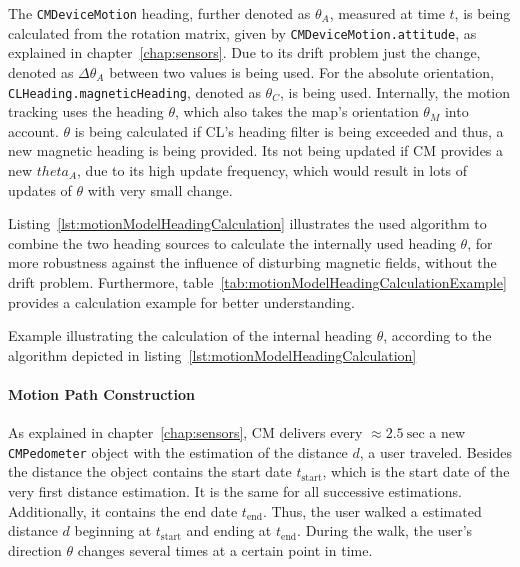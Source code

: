 The \texttt{CMDeviceMotion} heading, further denoted as $\theta_A$, measured at time $t$, is being calculated from the rotation matrix, given by \texttt{CMDeviceMotion.attitude}, as explained in chapter~\ref{chap:sensors}. Due to its drift problem just the change, denoted as $\Delta\theta_A$ between two values is being used. For the absolute orientation, \texttt{CLHeading.magneticHeading}, denoted as $\theta_C$, is being used. Internally, the motion tracking uses the heading $\theta$, which also takes the map's orientation $\theta_M$ into account. $\theta$ is being calculated if \acs{CL}'s heading filter is being exceeded and thus, a new magnetic heading is being provided. Its not being updated if \acs{CM} provides a new $theta_A$, due to its high update frequency, which would result in lots of updates of $\theta$ with very small change.

Listing~\ref{lst:motionModelHeadingCalculation} illustrates the used algorithm to combine the two heading sources to calculate the internally used heading $\theta$, for more robustness against the influence of disturbing magnetic fields, without the drift problem. Furthermore, table~\ref{tab:motionModelHeadingCalculationExample} provides a calculation example for better understanding.



\begin{table}
	
	\caption{Example illustrating the calculation of the internal heading $\theta$, according to the algorithm depicted in listing~\ref{lst:motionModelHeadingCalculation}}
	\label{tab:motionModelHeadingCalculationExample}
\end{table}

\paragraph{Motion Path Construction}
As explained in chapter~\ref{chap:sensors}, \acs{CM} delivers every $\approx 2.5~\text{sec}$ a new \texttt{CMPedometer} object with the estimation of the distance $d$, a user traveled. Besides the distance the object contains the start date $t_\text{start}$, which is the start date of the very first distance estimation. It is the same for all successive estimations. Additionally, it contains the end date $t_\text{end}$. Thus, the user walked a estimated distance $d$ beginning at $t_\text{start}$ and ending at $t_\text{end}$. During the walk, the user's direction $\theta$ changes several times at a certain point in time.

